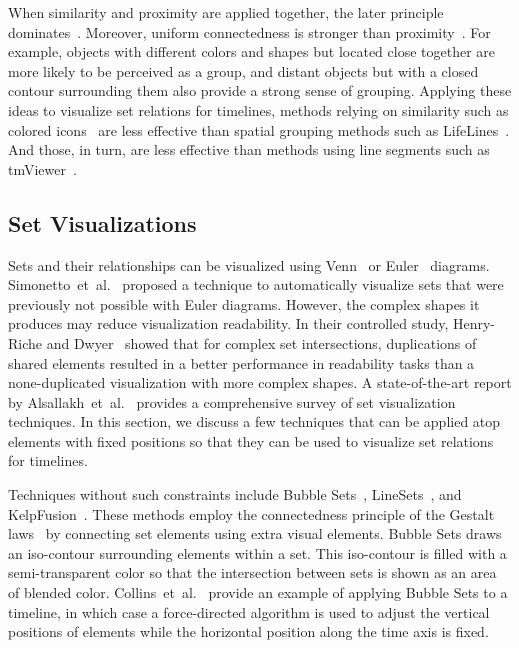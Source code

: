 When similarity and proximity are applied together, the later principle dominates~\cite{Ware2013}. Moreover, uniform connectedness is stronger than proximity~\cite{Palmer1994}. For example, objects with different colors and shapes but located close together are more likely to be perceived as a group, and distant objects but with a closed contour surrounding them also provide a strong sense of grouping. Applying these ideas to visualize set relations for timelines, methods relying on similarity such as colored icons~\cite{Wang2008} are less effective than spatial grouping methods such as LifeLines~\cite{Plaisant1996}. And those, in turn, are less effective than methods using line segments such as tmViewer~\cite{Kumar1998}. 

\subsection{Set Visualizations}
Sets and their relationships can be visualized using Venn~\cite{Ruskey1997} or Euler~\cite{Rodgers2014} diagrams. Simonetto~et~al.~\cite{Simonetto2009} proposed a technique to automatically visualize sets that were previously not possible with Euler diagrams. However, the complex shapes it produces may reduce visualization readability. In their controlled study, Henry-Riche and Dwyer~\cite{Riche2010} showed that for complex set intersections, duplications of shared elements resulted in a better performance in readability tasks than a none-duplicated visualization with more complex shapes. A state-of-the-art report by Alsallakh~et~al.~\cite{Alsallakh2014} provides a comprehensive survey of set visualization techniques. In this section, we discuss a few techniques that can be applied atop elements with fixed positions so that they can be used to visualize set relations for timelines. 

Techniques without such constraints include Bubble Sets~\cite{Collins2009a}, LineSets~\cite{Alper2011}, and KelpFusion~\cite{Meulemans2013}. These methods employ the connectedness principle of the Gestalt laws~\cite{Palmer1994} by connecting set elements using extra visual elements. Bubble Sets draws an iso-contour surrounding elements within a set. This iso-contour is filled with a semi-transparent color so that the intersection between sets is shown as an area of blended color. Collins~et~al.~\cite{Collins2009a} provide an example of applying Bubble Sets to a timeline, in which case a force-directed algorithm is used to adjust the vertical positions of elements while the horizontal position along the time axis is fixed. 

